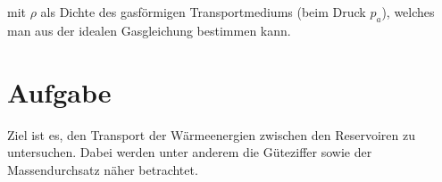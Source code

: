 mit $\rho$ als Dichte des gasförmigen Transportmediums (beim Druck $p_a$), welches man aus der idealen Gasgleichung bestimmen kann.

\section{Aufgabe}
\label{sec:Aufgabe}
Ziel ist es, den Transport der Wärmeenergien zwischen den Reservoiren zu untersuchen. Dabei werden unter anderem die Güteziffer sowie der Massendurchsatz näher betrachtet.

